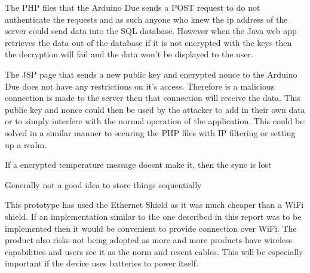 The PHP files that the Arduino Due sends a POST request to do not authenticate the requests and as such anyone who knew the ip address of the server could send data into the SQL database. However when the Java web app retrieves the data out of the database if it is not encrypted with the keys then the decryption will fail and the data won't be displayed to the user.

The JSP page that sends a new public key and encrypted nonce to the Arduino Due does not have any restrictions on it's access. Therefore is a malicious connection is made to the server then that connection will receive the data. This public key and nonce could then be used by the attacker to add in their own data or to simply interfere with the normal operation of the application. This could be solved in a similar manner to securing the PHP files with IP filtering or setting up a realm.

If a encrypted temperature message doesnt make it, then the sync is lost

Generally not a good idea to store things sequentially

This prototype has used the Ethernet Shield as it was much cheaper than a WiFi shield. If an implementation similar to the one described in this report was to be implemented then it would be convenient to provide connection over WiFi. The product also risks not being adopted as more and more products have wireless capabilities and  users see it as the norm and resent cables. This will be especially important if the device uses batteries to power itself.
